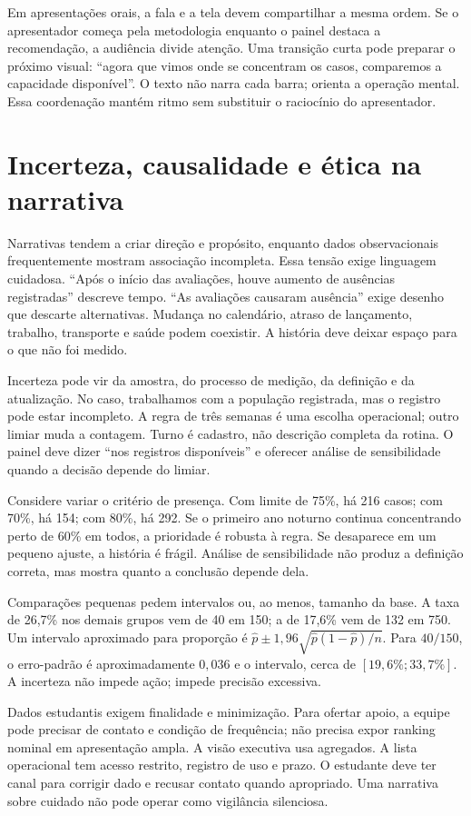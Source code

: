 Em apresentações orais, a fala e a tela devem compartilhar a mesma ordem. Se o apresentador começa pela metodologia enquanto o painel destaca a recomendação, a audiência divide atenção. Uma transição curta pode preparar o próximo visual: ``agora que vimos onde se concentram os casos, comparemos a capacidade disponível''. O texto não narra cada barra; orienta a operação mental. Essa coordenação mantém ritmo sem substituir o raciocínio do apresentador.

\section{Incerteza, causalidade e ética na narrativa}

Narrativas tendem a criar direção e propósito, enquanto dados observacionais frequentemente mostram associação incompleta. Essa tensão exige linguagem cuidadosa. ``Após o início das avaliações, houve aumento de ausências registradas'' descreve tempo. ``As avaliações causaram ausência'' exige desenho que descarte alternativas. Mudança no calendário, atraso de lançamento, trabalho, transporte e saúde podem coexistir. A história deve deixar espaço para o que não foi medido.

Incerteza pode vir da amostra, do processo de medição, da definição e da atualização. No caso, trabalhamos com a população registrada, mas o registro pode estar incompleto. A regra de três semanas é uma escolha operacional; outro limiar muda a contagem. Turno é cadastro, não descrição completa da rotina. O painel deve dizer ``nos registros disponíveis'' e oferecer análise de sensibilidade quando a decisão depende do limiar.

Considere variar o critério de presença. Com limite de 75\%, há 216 casos; com 70\%, há 154; com 80\%, há 292. Se o primeiro ano noturno continua concentrando perto de 60\% em todos, a prioridade é robusta à regra. Se desaparece em um pequeno ajuste, a história é frágil. Análise de sensibilidade não produz a definição correta, mas mostra quanto a conclusão depende dela.

Comparações pequenas pedem intervalos ou, ao menos, tamanho da base. A taxa de 26,7\% nos demais grupos vem de 40 em 150; a de 17,6\% vem de 132 em 750. Um intervalo aproximado para proporção é $\hat p\pm1{,}96\sqrt{\hat p(1-\hat p)/n}$. Para $40/150$, o erro-padrão é aproximadamente $0{,}036$ e o intervalo, cerca de $[19{,}6\%;33{,}7\%]$. A incerteza não impede ação; impede precisão excessiva.

Dados estudantis exigem finalidade e minimização. Para ofertar apoio, a equipe pode precisar de contato e condição de frequência; não precisa expor ranking nominal em apresentação ampla. A visão executiva usa agregados. A lista operacional tem acesso restrito, registro de uso e prazo. O estudante deve ter canal para corrigir dado e recusar contato quando apropriado. Uma narrativa sobre cuidado não pode operar como vigilância silenciosa.

